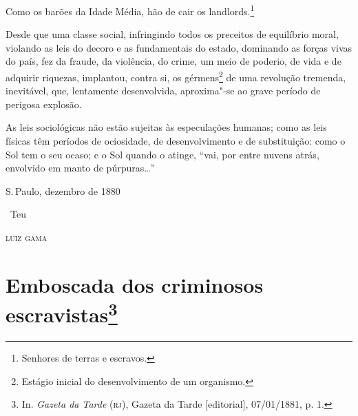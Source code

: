 Como os barões da Idade Média, hão de cair os landlords.\footnote{
  Senhores de terras e escravos.}

Desde que uma classe social, infringindo todos os preceitos de
equilíbrio moral, violando as leis do decoro e as fundamentais do
estado, dominando as forças vivas do país, fez da fraude, da violência,
do crime, um meio de poderio, de vida e de adquirir riquezas, implantou,
contra si, os gérmens\footnote{Estágio inicial do desenvolvimento de
  um organismo.} de uma
revolução tremenda, inevitável, que, lentamente desenvolvida,
aproxima"-se ao grave período de perigosa explosão.

As leis sociológicas não estão sujeitas às especulações humanas; como as
leis físicas têm períodos de ociosidade, de desenvolvimento e de
substituição: como o Sol tem o seu ocaso; e o Sol quando o atinge, ``vai,
por entre nuvens atrás, envolvido em manto de púrpuras\ldots{}''

\bigskip

\hfill S.\,Paulo, dezembro de 1880\smallskip

\hfill\ Teu

\hfill\textsc{luiz gama}

\chapter{Emboscada dos criminosos escravistas\footnote[*]{In.
  \emph{Gazeta da Tarde} (\textsc{rj}), Gazeta da Tarde {[}editorial{]},
  07/01/1881, p. 1.}}

